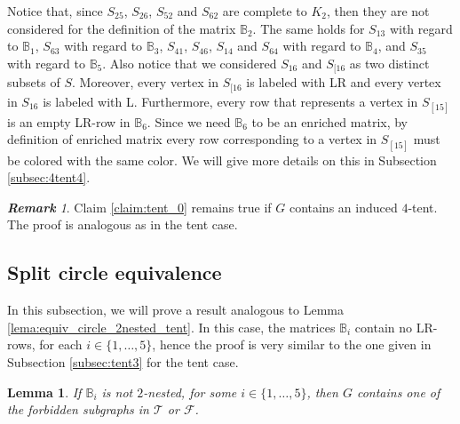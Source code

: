 \documentclass[12pt]{book}
\theoremstyle{plain}
\newtheorem{lema}[teo]{Lemma}
\theoremstyle{remark}
\newtheorem{remark}[teo]{\textbf{\textit{Remark}}}
\begin{document}
Notice that, since $S_{25}$, $S_{26}$, $S_{52}$ and $S_{62}$ are complete to $K_2$, then they are not considered for the definition of the matrix $\mathbb B_2$. The same holds for $S_{13}$ with regard to $\mathbb B_1$, $S_{63}$ with regard to $\mathbb B_3$, $S_{41}$, $S_{46}$, $S_{14}$ and $S_{64}$ with regard to $\mathbb B_4$, and $S_{35}$ with regard to $\mathbb B_5$.
Also notice that we considered $S_{16}$ and $S_{[16}$ as two distinct subsets of $S$. Moreover, every vertex in $S_{[16}$ is labeled with LR and every vertex in $S_{16}$ is labeled with L. 
Furthermore, every row that represents a vertex in $S_{[15]}$ is an empty LR-row in $\mathbb B_6$. Since we need $\mathbb B_6$ to be an enriched matrix, by definition of enriched matrix every row corresponding to a vertex in $S_{[15]}$ must be colored with the same color.
We will give more details on this in Subsection \ref{subsec:4tent4}.


\begin{remark}
	Claim \ref{claim:tent_0} remains true if $G$ contains an induced $4$-tent.
	The proof is anal\-o\-gous as in the tent case.
\end{remark}


\subsection{Split circle equivalence} \label{subsec:4tent3}

In this subsection, we will prove a result analogous to Lemma \ref{lema:equiv_circle_2nested_tent}. In this case, the matrices $\mathbb B_i$ contain no LR-rows, for each $i \in \{1, \ldots, 5 \}$, hence the proof is very similar to the one given in Subsection \ref{subsec:tent3} for the tent case.


\begin{lema}  \label{lema:equiv_circle_2nested_4tent_sinLR} %
	If $\mathbb B_i$ is not $2$-nested, for some $i \in \{ 1, \ldots, 5 \}$, then $G$ contains one of the forbidden subgraphs in $\mathcal{T}$ or $\mathcal{F}$. 
\end{lema}
\end{document}
